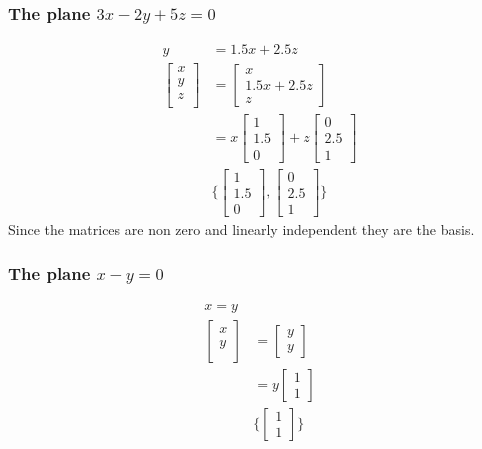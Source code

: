 \documentclass[12pt, a4paper]{article}
\begin{document}
			\subsubsection{The plane $3x-2y+5z=0$}
				\begin{align*}
					y&=1.5x+2.5z\\
					\begin{bmatrix} x \\ y\\ z\\\end{bmatrix}&=\begin{bmatrix}x\\1.5x+2.5z\\z\end{bmatrix}\\
					&=x\begin{bmatrix}1\\1.5\\0\end{bmatrix}+z\begin{bmatrix}0\\2.5\\1\end{bmatrix}\\
					&\{\begin{bmatrix}1\\1.5\\0\end{bmatrix},\begin{bmatrix}0\\2.5\\1\end{bmatrix}\}
				\end{align*}
				Since the matrices are non zero and linearly independent they are the basis.
			\subsubsection{The plane $x-y=0$}
				\begin{align*}
					x=y\\
					\begin{bmatrix} x \\ y\\ \end{bmatrix}&=\begin{bmatrix}y\\y\end{bmatrix}\\
					&=y\begin{bmatrix}1\\1\end{bmatrix}\\
					&\{\begin{bmatrix}1\\1\end{bmatrix}\}
				\end{align*}
				
\end{document}
